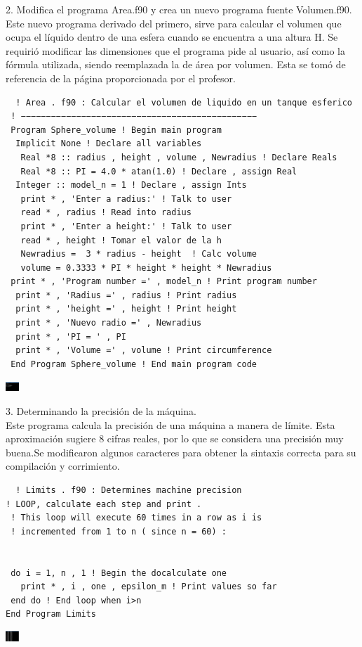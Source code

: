 \documentclass[12pt]{article}
\begin{document}
  2.  Modifica el programa Area.f90 y crea un nuevo programa fuente Volumen.f90.\\
  Este nuevo programa derivado del primero, sirve para calcular el volumen que ocupa el líquido dentro de una esfera cuando se encuentra a una altura H.
  Se requirió modificar las dimensiones que el programa pide al usuario, así como la fórmula utilizada, siendo reemplazada la de área por volumen. Esta se tomó de referencia de la página proporcionada por el profesor.\\
  \begin{verbatim}
  ! Area . f90 : Calcular el volumen de liquido en un tanque esferico
 ! −−−−−−−−−−−−−−−−−−−−−−−−−−−−−−−−−−−−−−−−−−−−−−−
 Program Sphere_volume ! Begin main program
  Implicit None ! Declare all variables
   Real *8 :: radius , height , volume , Newradius ! Declare Reals
   Real *8 :: PI = 4.0 * atan(1.0) ! Declare , assign Real
  Integer :: model_n = 1 ! Declare , assign Ints
   print * , 'Enter a radius:' ! Talk to user
   read * , radius ! Read into radius
   print * , 'Enter a height:' ! Talk to user
   read * , height ! Tomar el valor de la h
   Newradius =  3 * radius - height  ! Calc volume
   volume = 0.3333 * PI * height * height * Newradius
 print * , 'Program number =' , model_n ! Print program number
  print * , 'Radius =' , radius ! Print radius
  print * , 'height =' , height ! Print height
  print * , 'Nuevo radio =' , Newradius
  print * , 'PI = ' , PI
  print * , 'Volume =' , volume ! Print circumference
 End Program Sphere_volume ! End main program code
 \end{verbatim}
  \begin{center}
\includegraphics[width=0.5cm]{Volumenf90.png}\\
 \end{center}
  
  3. Determinando la precisión de la máquina.\\
  Este programa calcula la precisión de una máquina a manera de límite. Esta aproximación sugiere 8 cifras reales, por lo que se considera una precisión muy buena.Se modificaron algunos caracteres para obtener la sintaxis correcta para su compilación y corrimiento.\\
  \begin{verbatim}
  ! Limits . f90 : Determines machine precision
! LOOP, calculate each step and print .
 ! This loop will execute 60 times in a row as i is
 ! incremented from 1 to n ( since n = 60) :


 do i = 1, n , 1 ! Begin the docalculate one
   print * , i , one , epsilon_m ! Print values so far
 end do ! End loop when i>n
End Program Limits
 \end{verbatim}
  \begin{center}
\includegraphics[width=0.5cm]{Precisionf90.png}\\
 \end{center}
 
\end{document}
